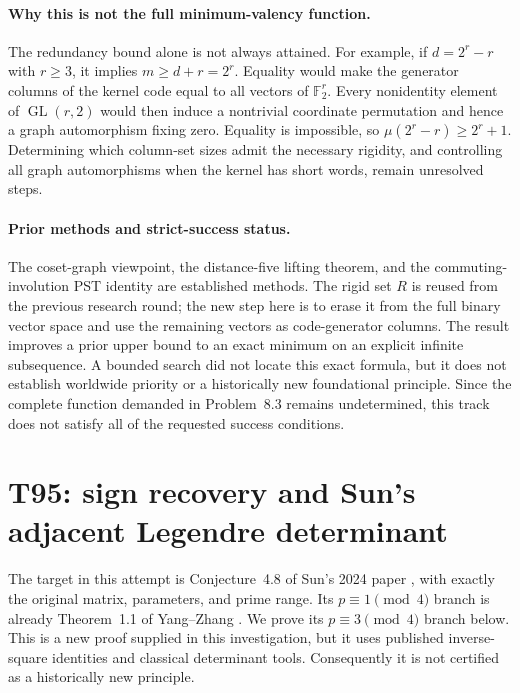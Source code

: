 \documentclass[11pt,a4paper]{article}
\theoremstyle{definition}
\theoremstyle{remark}
\begin{document}
\paragraph{Why this is not the full minimum-valency function.}
The redundancy bound alone is not always attained. For example, if
$d=2^r-r$ with $r\ge3$, it implies $m\ge d+r=2^r$.
Equality would make the generator columns of the kernel code equal to all
vectors of $\mathbb F_2^r$. Every nonidentity element of
$\operatorname{GL}(r,2)$ would then induce a nontrivial coordinate
permutation and hence a graph automorphism fixing zero. Equality is
impossible, so $\mu(2^r-r)\ge2^r+1$. Determining which column-set sizes
admit the necessary rigidity, and controlling all graph automorphisms
when the kernel has short words, remain unresolved steps.

\paragraph{Prior methods and strict-success status.}
The coset-graph viewpoint, the distance-five lifting theorem, and the
commuting-involution PST identity are established methods. The rigid set
$R$ is reused from the previous research round; the new step here is to
erase it from the full binary vector space and use the remaining vectors
as code-generator columns. The result improves a prior upper bound to an
exact minimum on an explicit infinite subsequence. A bounded search did
not locate this exact formula, but it does not establish worldwide
priority or a historically new foundational principle. Since the complete
function demanded in Problem~8.3 remains undetermined, this track does
not satisfy all of the requested success conditions.



\section{T95: sign recovery and Sun's adjacent Legendre determinant}
\label{sec:t95sun}

The target in this attempt is Conjecture~4.8 of Sun's 2024 paper
\cite{t95sun2024}, with exactly the original matrix, parameters, and prime
range. Its $p\equiv1\pmod4$ branch is already Theorem~1.1 of
Yang--Zhang \cite{t95yang2026}. We prove its $p\equiv3\pmod4$ branch
below. This is a new proof supplied in this investigation, but it uses
published inverse-square identities and classical determinant tools.
Consequently it is not certified as a historically new principle.
\end{document}
